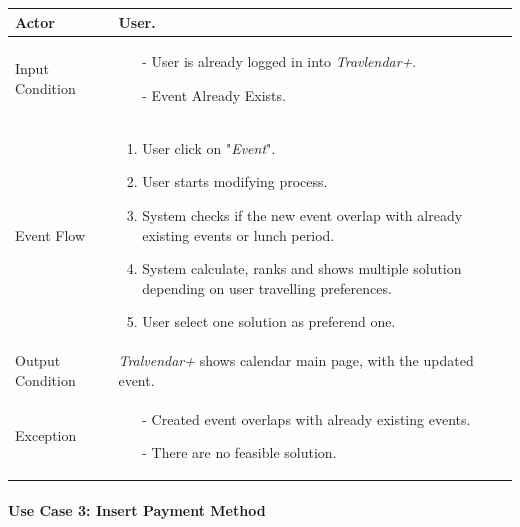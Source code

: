 		\begin{tabular}{| l | p{} | }
			\hline
			\hline
			Actor	&		User. \\
			\hline
			Input Condition		&		\begin{itemize}
													\item[-] User is already logged in into \textit{Travlendar+}.
													\item[-] Event Already Exists.
												\end{itemize} \\
			\hline
			Event Flow		&		\begin{enumerate}
												\item User click on "\textit{Event}".
												\item User starts modifying process.
												\item System checks if the new event overlap with already existing events or lunch period.
												\item	 System calculate, ranks and shows multiple solution depending on user travelling preferences.
												\item User select one solution as preferend one.
											\end{enumerate} \\
			\hline
			Output Condition		&		\textit{Tralvendar+} shows calendar main page, with the updated event. \\
			\hline		
			Exception		&		\begin{itemize}
											\item[-] Created event overlaps with already existing events.
											\item[-] There are no feasible solution.
										\end{itemize} \\
			\hline
			\hline
		\end{tabular}
		
		

	\paragraph{Use Case 3: Insert Payment Method}
	
